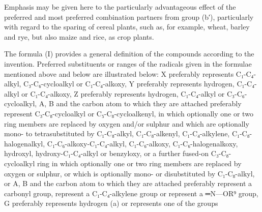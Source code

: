 \documentclass[11pt,a4paper]{article}
\begin{document}
Emphasis may be given here to the particularly advantageous effect of the preferred and most preferred combination partners from group (b′), particularly with regard to the sparing of cereal plants, such as, for example, wheat, barley and rye, but also maize and rice, as crop plants.

The formula (I) provides a general definition of the compounds according to the invention. Preferred substituents or ranges of the radicals given in the formulae mentioned above and below are illustrated below: X preferably represents C₁-C₄-alkyl, C₃-C₆-cycloalkyl or C₁-C₄-alkoxy, Y preferably represents hydrogen, C₁-C₄-alkyl or C₁-C₄-alkoxy, Z preferably represents hydrogen, C₁-C₄-alkyl or C₃-C₆-cycloalkyl, A, B and the carbon atom to which they are attached preferably represent C₃-C₈-cycloalkyl or C₅-C₈-cycloalkenyl, in which optionally one or two ring members are replaced by oxygen and/or sulphur and which are optionally mono- to tetrasubstituted by C₁-C₈-alkyl, C₁-C₈-alkenyl, C₁-C₄-alkylene, C₁-C₈-halogenalkyl, C₁-C₆-alkoxy-C₁-C₄-alkyl, C₁-C₆-alkoxy, C₁-C₆-halogenalkoxy, hydroxyl, hydroxy-C₁-C₄-alkyl or benzyloxy, or a further fused-on C₃-C₈-cycloalkyl ring in which optionally one or two ring members are replaced by oxygen or sulphur, or which is optionally mono- or disubstituted by C₁-C₈-alkyl, or A, B and the carbon atom to which they are attached preferably represent a carbonyl group, represent a C₁-C₄-alkylene group or represent a ═N—OR⁹ group, G preferably represents hydrogen (a) or represents one of the groups
\end{document}
